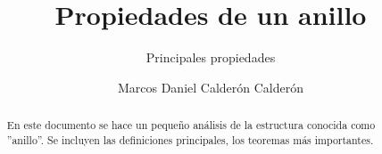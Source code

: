 \documentclass{llncs}
\theoremstyle{plane}
\begin{document}
\title{Propiedades de un anillo}


\subtitle{Principales propiedades}


\author{Marcos Daniel Calderón Calderón}






\maketitle

\begin{abstract}
En este documento se hace un pequeño análisis de la estructura conocida como ''anillo''. Se incluyen las definiciones principales, los teoremas más importantes.
\end{abstract}
\end{document}
